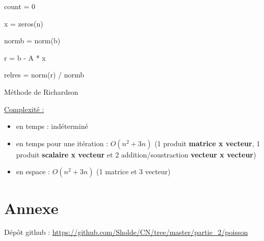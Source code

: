 \documentclass[11pt]{article}
\begin{document}
\begin{algorithm} [H]
  \SetAlgoLined

  count = 0 

  x = zeros(n) 

  normb = norm(b) 
  
  r = b - A * x 

  relres = norm(r) / normb 
  

  \caption{Méthode de Richardson}
\end{algorithm}

\vspace{5mm}

\underline{Complexité :}

\begin{itemize}
\item en temps : indéterminé
\item en temps pour une itération : $O(n^2 + 3n)$ (1 produit
  \textbf{matrice x vecteur}, 1 produit \textbf{scalaire x vecteur} et
  2 addition/soustraction \textbf{vecteur x vecteur})
\item en espace : $O(n^2 + 3n)$ (1 matrice et 3 vecteur)
\end{itemize}

\section{Annexe}

Dépôt github : \url{https://github.com/Sholde/CN/tree/master/partie_2/poisson}
\end{document}
